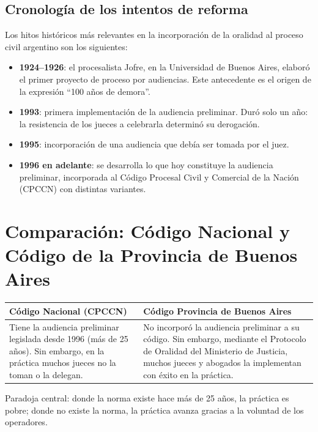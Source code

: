\documentclass[12pt,oneside]{book}
\begin{document}
\subsection{Cronología de los intentos de reforma}

Los hitos históricos más relevantes en la incorporación de la oralidad al proceso civil argentino son los siguientes:

\begin{itemize}
    \item \textbf{1924--1926}: el procesalista Jofre, en la Universidad de Buenos Aires, elaboró el primer proyecto de proceso por audiencias. Este antecedente es el origen de la expresión “100 años de demora”.
    \item \textbf{1993}: primera implementación de la audiencia preliminar. Duró solo un año: la resistencia de los jueces a celebrarla determinó su derogación.
    \item \textbf{1995}: incorporación de una audiencia que debía ser tomada por el juez.
    \item \textbf{1996 en adelante}: se desarrolla lo que hoy constituye la audiencia preliminar, incorporada al Código Procesal Civil y Comercial de la Nación (CPCCN) con distintas variantes.
\end{itemize}

\section{Comparación: Código Nacional y Código de la Provincia de Buenos Aires}

\begin{table}[H]
\centering
\begin{tabularx}{\textwidth}{>{\raggedright\arraybackslash}X >{\raggedright\arraybackslash}X}
\toprule
\textbf{Código Nacional (CPCCN)} & \textbf{Código Provincia de Buenos Aires} \\
\midrule
Tiene la audiencia preliminar legislada desde 1996 (más de 25 años). Sin embargo, en la práctica muchos jueces no la toman o la delegan. &
No incorporó la audiencia preliminar a su código. Sin embargo, mediante el Protocolo de Oralidad del Ministerio de Justicia, muchos jueces y abogados la implementan con éxito en la práctica. \\
\bottomrule
\end{tabularx}
\end{table}

\begin{important}
Paradoja central: donde la norma existe hace más de 25 años, la práctica es pobre; donde no existe la norma, la práctica avanza gracias a la voluntad de los operadores.
\end{important}
\end{document}
